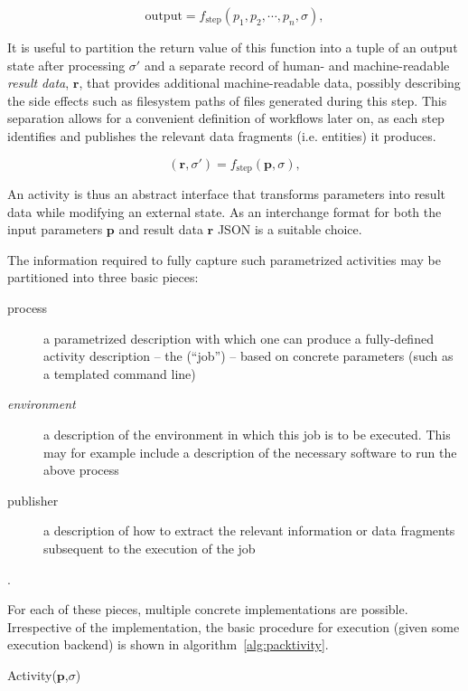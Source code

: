 \documentclass[a4paper]{jpconf}
\begin{document}
\begin{equation}
\mathrm{output} = f_{\mathrm{step}}(p_1,p_2,\cdots,p_n, \sigma),
\label{eq:singlestep}
\end{equation}

It is useful to partition the return value of this function into a tuple of an output state after processing $\sigma'$ and a separate record of human- and machine-readable \emph{result data}, $\mathbf{r}$, that provides additional machine-readable data, possibly describing the side effects such as filesystem paths of files generated during this step. This separation allows for a convenient definition of workflows later on, as each step identifies and publishes the relevant data fragments (i.e. entities) it produces.

\begin{equation}
(\mathbf{r},\sigma') = f_{\mathrm{step}}(\mathbf{p}, \sigma),
\label{eq:singlestep_v2}
\end{equation}

An activity is thus an abstract interface that transforms parameters into result data while modifying an external state. As an interchange format for both the input parameters $\mathbf{p}$ and result data $\mathbf{r}$ JSON is a suitable choice.

The information required to fully capture such parametrized activities may be partitioned into three basic pieces:

\begin{description}
    \item[process] a parametrized description with which one can produce a fully-defined activity description -- the (``job'') -- based on concrete parameters (such as a templated command line)
    \item[\emph{environment}] a description of the environment in which this job is to be executed. This may for example include a description of the necessary software to run the above process
    \item[publisher] a description of how to extract the relevant information or data fragments subsequent to the execution of the job
\end{description}.

For each of these pieces, multiple concrete implementations are possible. Irrespective of the implementation, the basic procedure for execution (given some execution backend) is shown in algorithm~\ref{alg:packtivity}.
\\

\begin{algorithm}[H]
\footnotesize
 \caption{Activity($\mathbf{p}$,$\sigma$)}
 \label{alg:packtivity}
\end{algorithm}
\end{document}
